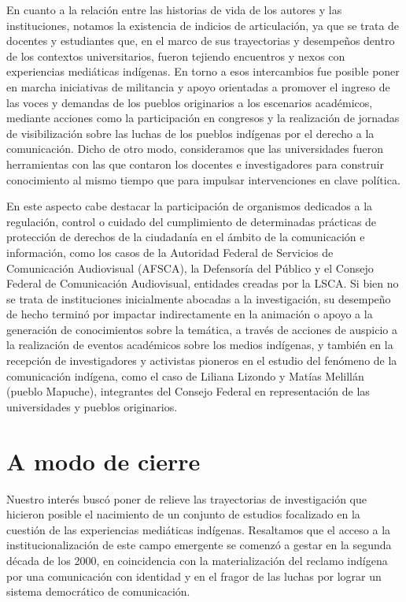 \documentclass{tufte-handout}
\begin{document}
En cuanto a la relación entre las historias de vida de los autores y las
instituciones, notamos la existencia de indicios de articulación, ya que
se trata de docentes y estudiantes que, en el marco de sus trayectorias
y desempeños dentro de los contextos universitarios, fueron tejiendo
encuentros y nexos con experiencias mediáticas indígenas. En torno a
esos intercambios fue posible poner en marcha iniciativas de militancia
y apoyo orientadas a promover el ingreso de las voces y demandas de los
pueblos originarios a los escenarios académicos, mediante acciones como
la participación en congresos y la realización de jornadas de
visibilización sobre las luchas de los pueblos indígenas por el derecho
a la comunicación. Dicho de otro modo, consideramos que las
universidades fueron herramientas con las que contaron los docentes e
investigadores para construir conocimiento al mismo tiempo que para
impulsar intervenciones en clave política.

En este aspecto cabe destacar la participación de organismos dedicados a
la regulación, control o cuidado del cumplimiento de determinadas
prácticas de protección de derechos de la ciudadanía en el ámbito de la
comunicación e información, como los casos de la Autoridad Federal de
Servicios de Comunicación Audiovisual (AFSCA), la Defensoría del Público
y el Consejo Federal de Comunicación Audiovisual, entidades creadas por
la LSCA. Si bien no se trata de instituciones inicialmente abocadas a la
investigación, su desempeño de hecho terminó por impactar indirectamente
en la animación o apoyo a la generación de conocimientos sobre la
temática, a través de acciones de auspicio a la realización de eventos
académicos sobre los medios indígenas, y también en la recepción de
investigadores y activistas pioneros en el estudio del fenómeno de la
comunicación indígena, como el caso de Liliana Lizondo y Matías Melillán
(pueblo Mapuche), integrantes del Consejo Federal en representación de
las universidades y pueblos originarios.

\hypertarget{a-modo-de-cierre}{%
\section{A modo de cierre}\label{a-modo-de-cierre}}

Nuestro interés buscó poner de relieve las trayectorias de investigación
que hicieron posible el nacimiento de un conjunto de estudios focalizado
en la cuestión de las experiencias mediáticas indígenas. Resaltamos que
el acceso a la institucionalización de este campo emergente se comenzó a
gestar en la segunda década de los 2000, en coincidencia con la
materialización del reclamo indígena por una comunicación con identidad
y en el fragor de las luchas por lograr un sistema democrático de
comunicación.
\end{document}
